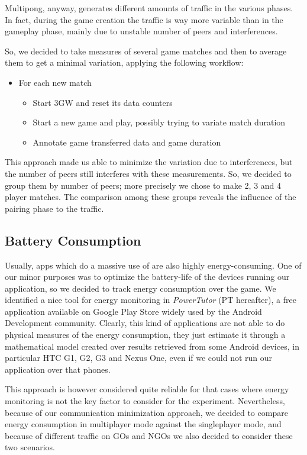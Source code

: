 Multipong, anyway, generates different amounts of traffic in the various
phases. In fact, during the game creation the traffic is way more variable than
in the gameplay phase, mainly due to unstable number of peers and \wifi{}
interferences.

So, we decided to take measures of several game matches and then to average them to get a minimal variation, applying the following workflow:

\begin{itemize}
\item For each new match
	\begin{itemize}
	\item Start 3GW and reset its data counters
	\item Start a new game and play, possibly trying to variate match duration
	\item Annotate game transferred data and game duration
	\end{itemize}
\end{itemize}

This approach made us able to minimize the variation due to interferences, but the number of peers still interferes with these measurements. So, we decided to group them by number of peers; more precisely we chose to make 2, 3 and 4 player matches. The comparison among these groups reveals the influence of the pairing phase to the traffic.

\subsection{Battery Consumption}

Usually, apps which do a massive use of \wifi{} are also highly energy-consuming. One of our minor purposes was to optimize the battery-life of the devices running our application, so we decided to track energy consumption over the game. We identified a nice tool for energy monitoring in \textit{PowerTutor} (PT hereafter), a free application available on Google Play Store widely used by the Android Development community. Clearly, this kind of applications are not able to do physical measures of the energy consumption, they just estimate it through a mathematical model created over results retrieved from some Android devices, in particular HTC G1, G2, G3 and Nexus One, even if we could not run our application over that phones. 

This approach is however considered quite reliable for that cases where energy monitoring is not the key factor to consider for the experiment. Nevertheless, because of our communication minimization approach, we decided to compare energy consumption in multiplayer mode against the singleplayer mode, and because of different traffic on GOs and NGOs we also decided to consider these two scenarios.
